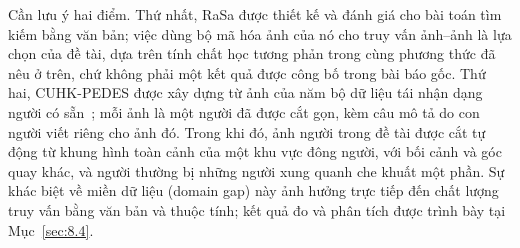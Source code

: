 Cần lưu ý hai điểm. Thứ nhất, RaSa được thiết kế và đánh giá cho bài toán tìm kiếm bằng văn bản; việc dùng bộ mã hóa ảnh của nó cho truy vấn ảnh--ảnh là lựa chọn của đề tài, dựa trên tính chất học tương phản trong cùng phương thức đã nêu ở trên, chứ không phải một kết quả được công bố trong bài báo gốc. Thứ hai, CUHK-PEDES được xây dựng từ ảnh của năm bộ dữ liệu tái nhận dạng người có sẵn~\cite{li2017cuhkpedes}; mỗi ảnh là một người đã được cắt gọn, kèm câu mô tả do con người viết riêng cho ảnh đó. Trong khi đó, ảnh người trong đề tài được cắt tự động từ khung hình toàn cảnh của một khu vực đông người, với bối cảnh và góc quay khác, và người thường bị những người xung quanh che khuất một phần. Sự khác biệt về miền dữ liệu (domain gap) này ảnh hưởng trực tiếp đến chất lượng truy vấn bằng văn bản và thuộc tính; kết quả đo và phân tích được trình bày tại Mục~\ref{sec:8.4}.
